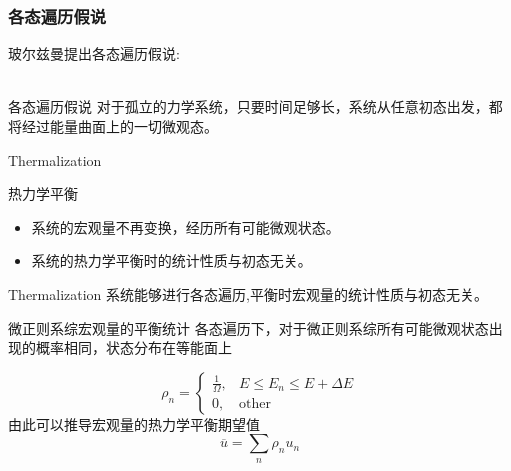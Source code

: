 \documentclass{beamer}
\begin{document}



\begin{frame}
\frametitle{各态遍历假说}
\noindent
玻尔兹曼提出各态遍历假说:\\~

\begin{block}{各态遍历假说}
对于孤立的力学系统，只要时间足够长，系统从任意初态出发，都将经过能量曲面上的一切微观态。
\end{block}
\end{frame}

\begin{frame}{Thermalization}
\noindent

\begin{block}{热力学平衡}
\begin{itemize}
\item 系统的宏观量不再变换，经历所有可能微观状态。
\item 系统的热力学平衡时的统计性质与初态无关。
\end{itemize}
\end{block}
\noindent
\begin{block}{Thermalization}
系统能够进行各态遍历,平衡时宏观量的统计性质与初态无关。
\end{block}
\end{frame}

\begin{frame}{微正则系综宏观量的平衡统计}
\noindent
各态遍历下，对于微正则系综所有可能微观状态出现的概率相同，状态分布在等能面上

$$
{\rho}_n=
\begin{cases}
\frac{1}{\Omega},&E\le E_n \le E+\Delta E\\
0, &\text{other}
\end{cases}
$$
由此可以推导宏观量的热力学平衡期望值
$$\overline{u}=\sum_{n}{\rho_n u_n}$$

\end{frame}
\end{document}
